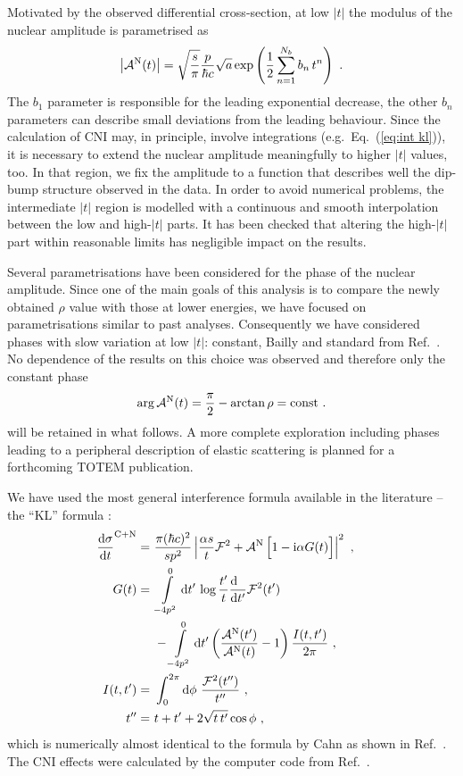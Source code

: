 Motivated by the observed differential cross-section, at low $|t|$ the modulus of the nuclear amplitude is parametrised as
\begin{equation}
\label{eq:nuc mod}
\left | {\cal A}^{\rm N}(t) \right | = \sqrt{s\over\pi} {p\over \hbar c} \sqrt{a} \exp\left( {1\over 2} \sum\limits_{n = 1}^{N_b} b_n\, t^n \right)\ .
\end{equation}
The $b_1$ parameter is responsible for the leading exponential decrease, the other $b_n$ parameters can describe small deviations from the leading behaviour. Since the calculation of CNI may, in principle, involve integrations (e.g.~Eq.~(\ref{eq:int kl})), it is necessary to extend the nuclear amplitude meaningfully to higher $|t|$ values, too. In that region, we fix the amplitude to a function that describes well the dip-bump structure observed in the data. In order to avoid numerical problems, the intermediate $|t|$ region is modelled with a continuous and smooth interpolation between the low and high-$|t|$ parts. It has been checked that altering the high-$|t|$ part within reasonable limits has negligible impact on the results.

Several parametrisations have been considered for the phase of the nuclear amplitude. Since one of the main goals of this analysis is to compare the newly obtained $\rho$ value with those at lower energies, we have focused on parametrisations similar to past analyses. Consequently we have considered phases with slow variation at low $|t|$: constant, Bailly and standard from Ref.~\cite{totem-8tev-1km}. No dependence of the results on this choice was observed and therefore only the constant phase
\begin{equation}
\label{eq:nuc phase con}
\arg {\cal A}^{\rm N}(t) = {\pi\over 2} - \arctan\rho = \hbox{const} \ .
\end{equation}
will be retained in what follows. A more complete exploration including phases leading to a peripheral description of elastic scattering is planned for a forthcoming TOTEM publication.

We have used the most general interference formula available in the literature -- the ``KL'' formula \cite{kl94}:
\begin{equation}
\label{eq:int kl}
	\begin{aligned}
		{\d\sigma\over \d t}^{\rm C+N} =\ & {\pi (\hbar c)^2 \over s p^2} \left | {\alpha s\over t} {\cal F}^2
			+ {\cal A}^{\rm N}\, \Big[1 - \I\alpha G(t)\Big] \right |^2\ ,\cr
		G(t) =\ & \int\limits_{-4p^2}^0 \d t'\, \log {t'\over t} {\d\phantom{t'}\over \d t'} {\cal F}^2(t')\cr
			  & - \int\limits_{-4p^2}^0 \d t' \left( {{\cal A}^{\rm N}(t') \over {\cal A}^{\rm N}(t)} - 1 \right) { I(t, t')\over 2\pi }\ , \cr
		I(t, t') =\ & \int_0^{2\pi} \d\phi\ {{\cal F}^2(t'')\over t''}\ ,\cr
		t'' =\ & t + t' + 2\sqrt{t\, t'} \cos\phi\ ,\cr
	\end{aligned}
\end{equation}
which is numerically almost identical to the formula by Cahn \cite{cahn82} as shown in Ref.~\cite{totem-8tev-1km}. The CNI effects were calculated by the computer code from Ref.~\cite{elegent}.


